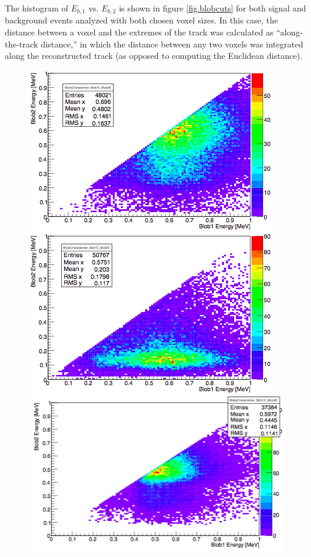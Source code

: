 \documentclass[a4paper,11pt]{article}
\begin{document}
The histogram of $E_{b,1}$ vs. $E_{b,2}$ is shown in figure \ref{fig.blobcuts} for both signal and
background events analyzed with both chosen voxel sizes.  In this case, the distance between a voxel and the extremes of the track was calculated as 
``along-the-track distance,'' in which the distance between any two voxels was integrated along the reconstructed track (as opposed to computing the Euclidean distance). 

\begin{figure}[!htb]
	\centering
	\includegraphics[scale = 0.49]{fig/blobcuts_bb0nu_10x10x5_E1vsE2.png}
	\includegraphics[scale = 0.49]{fig/blobcuts_Tl208_10x10x5_E1vsE2.png}	
	\includegraphics[scale = 0.45]{fig/blobcuts_bb0nu_2x2x2_E1vsE2.png}

\end{figure}
\end{document}
